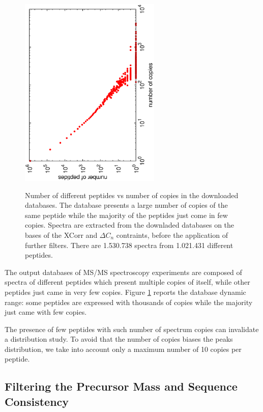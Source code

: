\begin{figure}[!thb]
\begin{center}
\includegraphics[angle=-90,width=0.6\textwidth]{./img/msms/all-peptides-expression-dist.eps}\\
\caption{\label{fig:multi-copies}
Number of different peptides vs number of copies in the downloaded
databases.
The database presents a large number of copies of the same
peptide while the majority of the peptides just come in few copies.
Spectra are extracted from the downladed databases on the bases of the XCorr and
$\Delta C_n$ contraints, before the application of further filters.
There are 1.530.738 spectra from 1.021.431 different peptides.}
\end{center}
\end{figure}

The output databases of MS/MS spectroscopy experiments are composed of spectra
of different peptides which present multiple copies of itself, while other
peptides just came in very few copies.
Figure \ref{fig:multi-copies} reports the database dynamic
range: some peptides are expressed with thousands of copies while the majority
just came with few copies.

The presence of few peptides with such number of spectrum copies can invalidate a
distribution study. To avoid that the number of copies biases the
peaks distribution, we take into account only a maximum number of 10 copies per
peptide.


\subsection{Filtering the Precursor Mass and Sequence Consistency}


